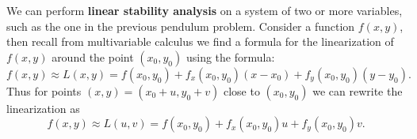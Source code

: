 
We can perform \textbf{linear stability analysis} on a system of two or more variables, such as the one in the previous pendulum problem. Consider a function $f(x,y)$, then recall from multivariable calculus we find a formula for the linearization of $f(x,y)$ around the point $(x_0,y_0)$ using the formula:
\[ f(x,y) \approx L(x,y) = f(x_0,y_0) + f_x(x_0,y_0)(x-x_0) + f_y(x_0,y_0)(y-y_0). \]
Thus for points $(x,y)=(x_0+u,y_0+v)$ close to $(x_0,y_0)$ we can rewrite the linearization as 
\[ f(x,y) \approx L(u,v) = f(x_0,y_0) + f_x(x_0,y_0)u + f_y(x_0,y_0)v. \]

